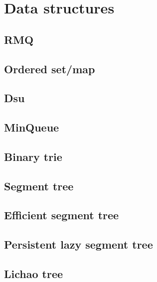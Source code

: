 \section{Data structures}

\subsection{RMQ}

\subsection{Ordered set/map}

\subsection{Dsu}

\subsection{MinQueue}

\subsection{Binary trie}

\subsection{Segment tree}

\subsection{Efficient segment tree}

\subsection{Persistent lazy segment tree}

\subsection{Lichao tree}

